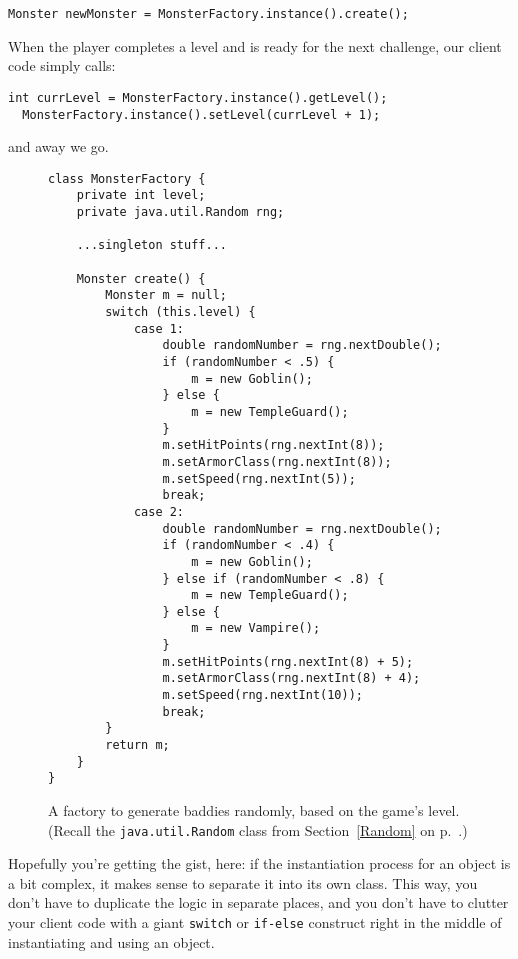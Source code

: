 \begin{Verbatim}[fontsize=\small,samepage=true,frame=none]
  Monster newMonster = MonsterFactory.instance().create();
\end{Verbatim}

When the player completes a level and is ready for the next challenge, our
client code simply calls:

\begin{Verbatim}[fontsize=\small,samepage=true,frame=none]
  int currLevel = MonsterFactory.instance().getLevel();
  MonsterFactory.instance().setLevel(currLevel + 1);
\end{Verbatim}

and away we go.

\begin{figure}
\begin{Verbatim}[fontsize=\footnotesize,samepage=true,frame=single]
class MonsterFactory {
    private int level;
    private java.util.Random rng;
    
    ...singleton stuff...

    Monster create() {
        Monster m = null;
        switch (this.level) {
            case 1:
                double randomNumber = rng.nextDouble();
                if (randomNumber < .5) {
                    m = new Goblin();
                } else {
                    m = new TempleGuard();
                }
                m.setHitPoints(rng.nextInt(8));
                m.setArmorClass(rng.nextInt(8));
                m.setSpeed(rng.nextInt(5));
                break;
            case 2:
                double randomNumber = rng.nextDouble();
                if (randomNumber < .4) {
                    m = new Goblin();
                } else if (randomNumber < .8) {
                    m = new TempleGuard();
                } else {
                    m = new Vampire();
                }
                m.setHitPoints(rng.nextInt(8) + 5);
                m.setArmorClass(rng.nextInt(8) + 4);
                m.setSpeed(rng.nextInt(10));
                break;
        }
        return m;
    }
}
\end{Verbatim}
\caption{A factory to generate baddies randomly, based on the game's level.
(Recall the \texttt{java.util.Random} class from Section~\ref{Random} on
p.~\pageref{Random}.)}
\label{fig:monsterFactoryCode}
\end{figure}

Hopefully you're getting the gist, here: if the instantiation process for an
object is a bit complex, it makes sense to separate it into its own class.
This way, you don't have to duplicate the logic in separate places, and you
don't have to clutter your client code with a giant \texttt{switch} or
\texttt{if-else} construct right in the middle of instantiating and using an
object.


